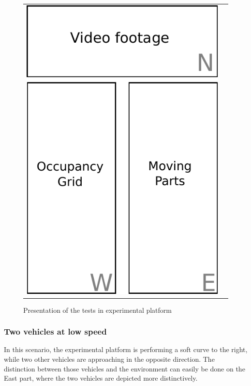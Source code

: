 \begin{figure}[H]
   \centering
     \begin{tabular}{lr}
       \includegraphics[scale=0.60]{img/fig:result:framework}
     \end{tabular}
   \caption{Presentation of the tests in experimental platform}
   \label{fig:result:framework}
\end{figure}

\subsubsection{Two vehicles at low speed}

In this scenario, the experimental platform is performing a soft curve to the right, while two other vehicles are approaching in the opposite direction. The distinction between those vehicles and the environment can easily be done on the East part, where the two vehicles are depicted more distinctively.

